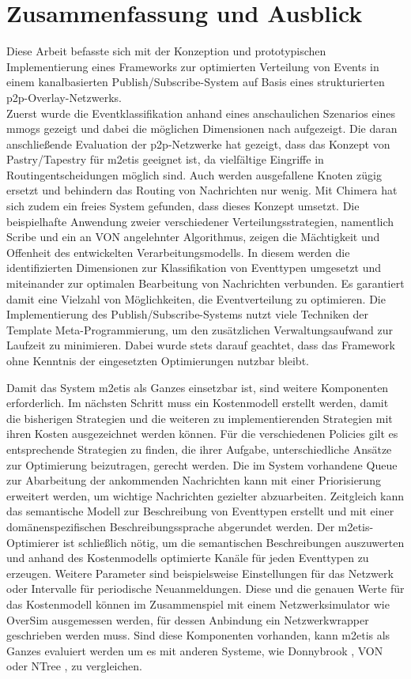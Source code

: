\chapter{Zusammenfassung und Ausblick} 
\label{chap:zus}
Diese Arbeit befasste sich mit der Konzeption und prototypischen Implementierung eines Frameworks zur optimierten Verteilung von Events in einem kanalbasierten Publish/Subscribe-System auf Basis eines strukturierten p2p-Overlay-Netzwerks.\\
Zuerst wurde die Eventklassifikation anhand eines anschaulichen Szenarios eines \acp{mmog} gezeigt und dabei die möglichen Dimensionen nach \cite{Fischer2010Event} aufgezeigt. Die daran anschließende Evaluation der p2p-Netzwerke hat gezeigt, dass das Konzept von Pastry/Tapestry für \ac{m2etis} geeignet ist, da vielfältige Eingriffe in Routingentscheidungen möglich sind. Auch werden ausgefallene Knoten zügig ersetzt und behindern das Routing von Nachrichten nur wenig. Mit Chimera hat sich zudem ein freies System gefunden, dass dieses Konzept umsetzt. Die beispielhafte Anwendung zweier verschiedener Verteilungsstrategien, namentlich Scribe und ein an VON angelehnter Algorithmus, zeigen die Mächtigkeit und Offenheit des entwickelten Verarbeitungsmodells. In diesem werden die identifizierten Dimensionen zur Klassifikation von Eventtypen umgesetzt und miteinander zur optimalen Bearbeitung von Nachrichten verbunden. Es garantiert damit eine Vielzahl von Möglichkeiten, die Eventverteilung zu optimieren. Die Implementierung des Publish/Subscribe-Systems nutzt viele Techniken der Template Meta-Programmierung, um den zusätzlichen Verwaltungsaufwand zur Laufzeit zu minimieren. Dabei wurde stets darauf geachtet, dass das Framework ohne Kenntnis der eingesetzten Optimierungen nutzbar bleibt.

Damit das System \ac{m2etis} als Ganzes einsetzbar ist, sind weitere Komponenten erforderlich. Im nächsten Schritt muss ein Kostenmodell erstellt werden, damit die bisherigen Strategien und die weiteren zu implementierenden Strategien mit ihren Kosten ausgezeichnet werden können. Für die verschiedenen Policies gilt es entsprechende Strategien zu finden, die ihrer Aufgabe, unterschiedliche Ansätze zur Optimierung beizutragen, gerecht werden. Die im System vorhandene Queue zur Abarbeitung der ankommenden Nachrichten kann mit einer Priorisierung erweitert werden, um wichtige Nachrichten gezielter abzuarbeiten. Zeitgleich kann das semantische Modell zur Beschreibung von Eventtypen erstellt und mit einer domänenspezifischen Beschreibungssprache abgerundet werden. Der \ac{m2etis}-Optimierer ist schließlich nötig, um die semantischen Beschreibungen auszuwerten und anhand des Kostenmodells optimierte Kanäle für jeden Eventtypen zu erzeugen. Weitere Parameter sind beispielsweise Einstellungen für das Netzwerk oder Intervalle für periodische Neuanmeldungen. Diese und die genauen Werte für das Kostenmodell können im Zusammenspiel mit einem Netzwerksimulator wie OverSim \cite{Baumgart2007OverSim} ausgemessen werden, für dessen Anbindung ein Netzwerkwrapper geschrieben werden muss. Sind diese Komponenten vorhanden, kann \ac{m2etis} als Ganzes evaluiert werden um es mit anderen Systeme, wie Donnybrook \cite{Bharambe2008Donnybrook}, VON \cite{Hu2006VON} oder NTree \cite{GauthierDickey2005Using}, zu vergleichen.
